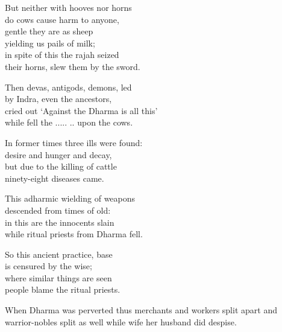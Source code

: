 \begin{MyDescription}{}
But neither with hooves nor horns\\
do cows cause harm to anyone,\\
gentle they are as sheep\\
yielding us pails of milk;\\
in spite of this the rajah seized\\
their horns, slew them by the sword.
\end{MyDescription} 

\begin{MyDescription}{}
Then devas, antigods, demons, led\\
by Indra, even the ancestors,\\
cried out `Against the Dharma is all this'\\
while fell the ..... .. upon the cows.
\end{MyDescription} 

\begin{MyDescription}{}
In former times three ills were found:\\
desire and hunger and decay,\\
but due to the killing of cattle\\
ninety-eight diseases came.
\end{MyDescription} 

\begin{MyDescription}{}
This adharmic wielding of weapons\\
descended from times of old:\\
in this are the innocents slain\\
while ritual priests from Dharma fell.
\end{MyDescription}     

\begin{MyDescription}{}
So this ancient practice, base\\
is censured by the wise;\\
where similar things are seen\\
people blame the ritual priests.
\end{MyDescription}   

\begin{MyDescription}{}
When Dharma was perverted thus
merchants and workers split apart
and warrior-nobles split as well
while wife her husband did despise.
\end{MyDescription}   

